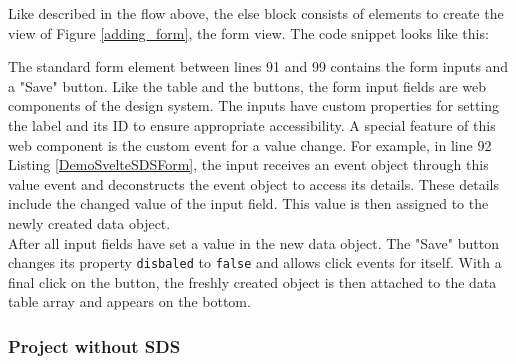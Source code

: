 Like described in the flow above, the else block consists of elements to create the view of Figure \ref{adding_form}, the form view. The code snippet looks like this:

The standard form element between lines 91 and 99 contains the form inputs and a "Save" button. Like the table and the buttons, the form input fields are web components of the design system. The inputs have custom properties for setting the label and its ID to ensure appropriate accessibility. A special feature of this web component is the custom event for a value change. For example, in line 92 Listing \ref{DemoSvelteSDSForm}, the input receives an event object through this value event and deconstructs the event object to access its details. These details include the changed value of the input field. This value is then assigned to the newly created data object. \\
After all input fields have set a value in the new data object. The "Save" button changes its property \texttt{disbaled} to \texttt{false} and allows click events for itself. With a final click on the button, the freshly created object is then attached to the data table array and appears on the bottom. 

\subsubsection{Project without SDS}
